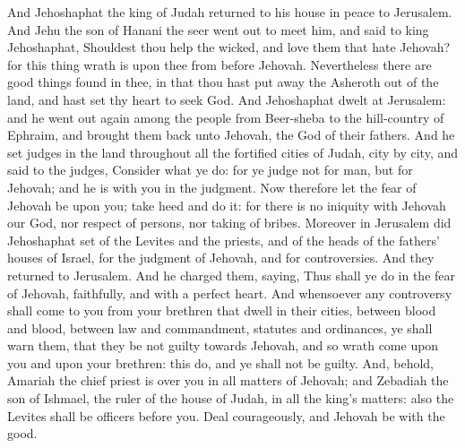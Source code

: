 And Jehoshaphat the king of Judah returned to his house in peace to Jerusalem. And Jehu the son of Hanani the seer went out to meet him, and said to king Jehoshaphat, Shouldest thou help the wicked, and love them that hate Jehovah? for this thing wrath is upon thee from before Jehovah. Nevertheless there are good things found in thee, in that thou hast put away the Asheroth out of the land, and hast set thy heart to seek God.  And Jehoshaphat dwelt at Jerusalem: and he went out again among the people from Beer-sheba to the hill-country of Ephraim, and brought them back unto Jehovah, the God of their fathers. And he set judges in the land throughout all the fortified cities of Judah, city by city, and said to the judges, Consider what ye do: for ye judge not for man, but for Jehovah; and he is with you in the judgment. Now therefore let the fear of Jehovah be upon you; take heed and do it: for there is no iniquity with Jehovah our God, nor respect of persons, nor taking of bribes.  Moreover in Jerusalem did Jehoshaphat set of the Levites and the priests, and of the heads of the fathers’ houses of Israel, for the judgment of Jehovah, and for controversies. And they returned to Jerusalem. And he charged them, saying, Thus shall ye do in the fear of Jehovah, faithfully, and with a perfect heart. And whensoever any controversy shall come to you from your brethren that dwell in their cities, between blood and blood, between law and commandment, statutes and ordinances, ye shall warn them, that they be not guilty towards Jehovah, and so wrath come upon you and upon your brethren: this do, and ye shall not be guilty. And, behold, Amariah the chief priest is over you in all matters of Jehovah; and Zebadiah the son of Ishmael, the ruler of the house of Judah, in all the king’s matters: also the Levites shall be officers before you. Deal courageously, and Jehovah be with the good. 

